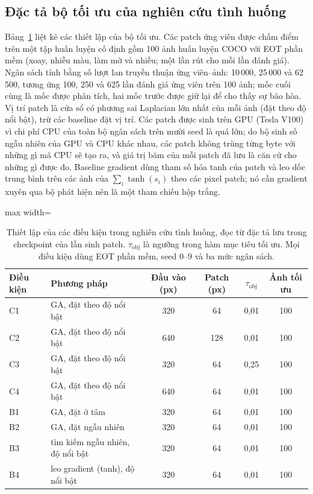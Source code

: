\documentclass[a4paper,fleqn]{cas-dc}
\begin{document}
\subsection{Đặc tả bộ tối ưu của nghiên cứu tình huống}
Bảng~\ref{tab:spec} liệt kê các thiết lập của bộ tối ưu. Các patch ứng viên được chấm điểm trên một tập huấn luyện cố định gồm 100 ảnh huấn luyện COCO \cite{lin2014coco} với EOT phần mềm (xoay, nhiễu màu, làm mờ và nhiễu; một lần rút cho mỗi lần đánh giá). Ngân sách tính bằng số lượt lan truyền thuận ứng viên--ảnh: 10\,000, 25\,000 và 62\,500, tương ứng 100, 250 và 625 lần đánh giá ứng viên trên 100 ảnh; mốc cuối cùng là mốc được phân tích, hai mốc trước được giữ lại để cho thấy sự bão hòa. Vị trí patch là cửa sổ có phương sai Laplacian lớn nhất của mỗi ảnh (đặt theo độ nổi bật), trừ các baseline đặt vị trí. Các patch được sinh trên GPU (Tesla V100) vì chi phí CPU của toàn bộ ngân sách trên mười seed là quá lớn; do bộ sinh số ngẫu nhiên của GPU và CPU khác nhau, các patch không trùng từng byte với những gì mã CPU sẽ tạo ra, và giá trị băm của mỗi patch đã lưu là căn cứ cho những gì được đo. Baseline gradient dùng tham số hóa tanh của patch và leo dốc trung bình trên các ảnh của $\sum_i \tanh(s_i)$ theo các pixel patch; nó cần gradient xuyên qua bộ phát hiện nên là một tham chiếu hộp trắng.

\begin{table}[!tp]
\centering\small
\caption{Thiết lập của các điều kiện trong nghiên cứu tình huống, đọc từ đặc tả lưu trong checkpoint của lần sinh patch. $\tau_{\mathrm{obj}}$ là ngưỡng trong hàm mục tiêu tối ưu. Mọi điều kiện dùng EOT phần mềm, seed 0--9 và ba mức ngân sách.}
\label{tab:spec}
\begin{adjustbox}{max width=\textwidth}
\begin{tabular}{@{}llcccc@{}}
\toprule
Điều kiện & Phương pháp & Đầu vào (px) & Patch (px) & $\tau_{\mathrm{obj}}$ & Ảnh tối ưu \\
\midrule
C1 & GA, đặt theo độ nổi bật & 320 & 64 & 0,01 & 100 \\
C2 & GA, đặt theo độ nổi bật & 640 & 128 & 0,01 & 100 \\
C3 & GA, đặt theo độ nổi bật & 320 & 64 & 0,25 & 100 \\
C4 & GA, đặt theo độ nổi bật & 640 & 64 & 0,01 & 100 \\
B1 & GA, đặt ở tâm & 320 & 64 & 0,01 & 100 \\
B2 & GA, đặt ngẫu nhiên & 320 & 64 & 0,01 & 100 \\
B3 & tìm kiếm ngẫu nhiên, độ nổi bật & 320 & 64 & 0,01 & 100 \\
B4 & leo gradient (tanh), độ nổi bật & 320 & 64 & 0,01 & 100 \\
\bottomrule
\end{tabular}
\end{adjustbox}
\end{table}
\end{document}
